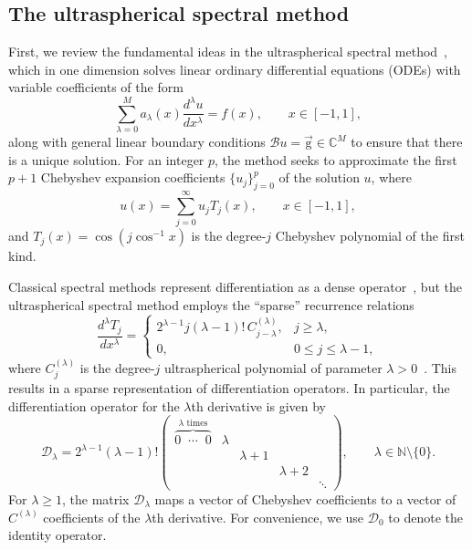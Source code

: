 \subsection{The ultraspherical spectral method}\label{sec:\chap:ultraS}

First, we review the fundamental ideas in the ultraspherical spectral method~\cite{Olver_13_01}, which in one dimension solves linear ordinary differential equations (ODEs) with variable coefficients of the form
\begin{equation}\label{eq:\chap:ode}
\sum_{\lambda=0}^M a_\lambda(x)\frac{d^\lambda u}{dx^\lambda} = f(x), \qquad x\in[-1,1],%
\end{equation}
along with general linear boundary conditions $\mathcal{B}u=\vec{\mathrm{g}} \in \mathbb{C}^M$ to ensure that there is a unique solution. For an integer $p$, the method seeks to approximate the first $p+1$ Chebyshev expansion coefficients $\{u_j\}_{j=0}^p$ of the solution $u$, where
\[
u(x) = \sum_{j=0}^\infty u_j T_j(x), \qquad x \in [-1,1],
\]
and $T_j(x) = \cos(j\cos^{-1}x)$ is the degree-$j$ Chebyshev polynomial of the first kind.

Classical spectral methods represent differentiation as a dense operator~\cite{Trefethen_00_01, Boyd_01_01}, but the ultraspherical spectral method employs the ``sparse'' recurrence relations
\begin{equation}
\frac{d^\lambda T_j}{dx^\lambda} = \begin{cases}
2^{\lambda-1} j (\lambda-1)!\,C^{(\lambda)}_{j-\lambda}, & j \geq \lambda, \\
0, & 0 \leq j \leq \lambda-1,
\end{cases}
\end{equation}
where $C^{(\lambda)}_j$ is the degree-$j$ ultraspherical polynomial of parameter $\lambda > 0$~\cite[Sec. 18.3]{NISTHandbook}. This results in a sparse representation of differentiation operators. In particular, the differentiation operator for the $\lambda$th derivative is given by
\[
\mathcal{D}_\lambda = 2^{\lambda-1} (\lambda-1)! \begin{pmatrix}
\overbrace{0\;\;\cdots\;\;0}^{\lambda \text{ times}} & \lambda \\
&& \lambda+1 \\
&&& \lambda+2 \\
&&&& \ddots
\end{pmatrix}, \qquad \lambda \in \mathbb{N}\setminus\{0\}.
\]
For $\lambda \geq 1$, the matrix $\mathcal{D}_\lambda$ maps a vector of Chebyshev coefficients to a vector of $C^{(\lambda)}$ coefficients of the $\lambda$th derivative. For convenience, we use $\mathcal{D}_0$ to denote the identity operator.

